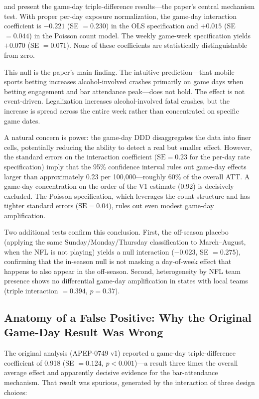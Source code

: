 \documentclass[12pt]{article}
\begin{document}
 and  present the game-day triple-difference results---the paper's central mechanism test. With proper per-day exposure normalization, the game-day interaction coefficient is $-0.221$ (SE $= 0.230$) in the OLS specification and $+0.015$ (SE $= 0.044$) in the Poisson count model. The weekly game-week specification yields $+0.070$ (SE $= 0.071$). None of these coefficients are statistically distinguishable from zero.

This null is the paper's main finding. The intuitive prediction---that mobile sports betting increases alcohol-involved crashes primarily on game days when betting engagement and bar attendance peak---does not hold. The effect is not event-driven. Legalization increases alcohol-involved fatal crashes, but the increase is spread across the entire week rather than concentrated on specific game dates.

A natural concern is power: the game-day DDD disaggregates the data into finer cells, potentially reducing the ability to detect a real but smaller effect. However, the standard errors on the interaction coefficient ($\text{SE} = 0.23$ for the per-day rate specification) imply that the 95\% confidence interval rules out game-day effects larger than approximately 0.23 per 100,000---roughly 60\% of the overall ATT. A game-day concentration on the order of the V1 estimate (0.92) is decisively excluded. The Poisson specification, which leverages the count structure and has tighter standard errors ($\text{SE} = 0.04$), rules out even modest game-day amplification.

Two additional tests confirm this conclusion. First, the off-season placebo (applying the same Sunday/Monday/Thursday classification to March--August, when the NFL is not playing) yields a null interaction ($-0.023$, SE $= 0.275$), confirming that the in-season null is not masking a day-of-week effect that happens to also appear in the off-season. Second, heterogeneity by NFL team presence shows no differential game-day amplification in states with local teams (triple interaction $= 0.394$, $p = 0.37$).

\subsection{Anatomy of a False Positive: Why the Original Game-Day Result Was Wrong}

The original analysis (APEP-0749 v1) reported a game-day triple-difference coefficient of 0.918 (SE $= 0.124$, $p < 0.001$)---a result three times the overall average effect and apparently decisive evidence for the bar-attendance mechanism. That result was spurious, generated by the interaction of three design choices:
\end{document}
